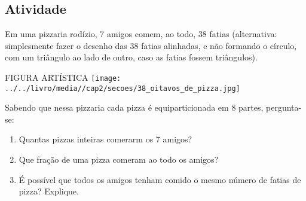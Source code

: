 \documentclass[a4,12pt]{book}
\begin{document}
\subsection{Atividade}






Em uma pizzaria rodízio, 7 amigos comem, ao todo, 38 fatias (alternativa: simplesmente fazer o desenho das 38 fatias alinhadas, e não formando o círculo, com um triângulo ao lado de outro, caso as fatias fossem triângulos).
\begin{imagem*}[breakable]{}{}   FIGURA ARTÍSTICA   
    \texttt{[image: ../../livro/media//cap2/secoes/38\_oitavos\_de\_pizza.jpg]}  
\end{imagem*}

Sabendo que nessa pizzaria cada pizza é equiparticionada em 8 partes, pergunta-se: 
\begin{enumerate} [\quad a)] %
  \item     Quantas pizzas inteiras comerarm os 7 amigos? 
  \item     Que fração de uma pizza comeram  ao todo os amigos? 
  \item     É possível que todos os amigos tenham comido o mesmo número de fatias de pizza? Explique.
\end{enumerate} %
\end{document}
